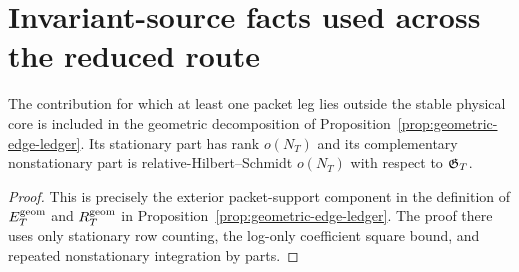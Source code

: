 \section{Invariant-source facts used across the reduced route}
\label{sec:route-facts}

\begin{proposition}
\label{prop:exterior-packet-support}
The contribution for which at least one packet leg lies outside the stable
physical core is included in the geometric decomposition of
Proposition~\ref{prop:geometric-edge-ledger}.  Its stationary part has rank
$o(N_T)$ and its complementary nonstationary part is
relative-Hilbert--Schmidt $o(N_T)$ with respect to $\mathfrak G_T$.
\end{proposition}

\begin{proof}
This is precisely the exterior packet-support component in the definition of
$E_T^{\rm geom}$ and $R_T^{\rm geom}$ in
Proposition~\ref{prop:geometric-edge-ledger}.  The proof there uses only
stationary row counting, the log-only coefficient square bound, and repeated
nonstationary integration by parts.
\end{proof}
